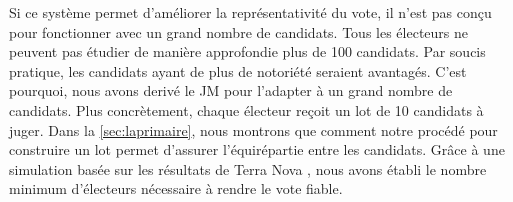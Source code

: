 \documentclass[conference]{IEEEtran}
\begin{document}
Si ce syst\`eme permet d'am\'eliorer la repr\'esentativit\'e du vote, il n'est pas con\c{c}u pour fonctionner avec un grand nombre de candidats. Tous les \'electeurs ne peuvent pas \'etudier de mani\`ere approfondie plus de 100 candidats. Par soucis pratique, les candidats ayant de plus de notori\'et\'e seraient avantag\'es. C'est pourquoi, nous avons deriv\'e le JM pour l'adapter \`a un grand nombre de candidats. Plus concr\`etement, chaque \'electeur re\c{c}oit un lot de 10 candidats \`a juger. Dans la \cref{sec:laprimaire}, nous montrons que comment notre proc\'ed\'e pour construire un lot permet d'assurer l'\'equir\'epartie entre les candidats. Gr\^ace \`a une simulation bas\'ee sur les r\'esultats de Terra Nova \cite{terra-nova}, nous avons \'etabli le nombre minimum d'\'electeurs n\'ecessaire \`a rendre le vote fiable.
\end{document}
